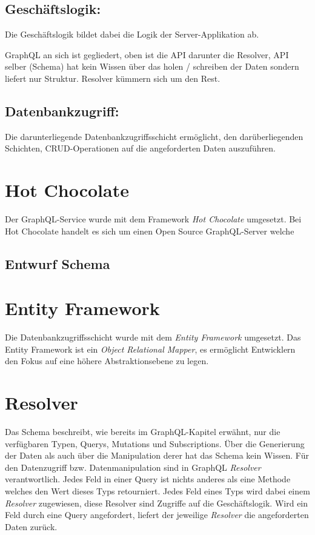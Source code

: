 
\subsection{Geschäftslogik:}
Die Geschäftslogik bildet dabei die Logik der Server-Applikation ab.

GraphQL an sich ist gegliedert, oben ist die API darunter die Resolver, API selber (Schema) hat kein Wissen über das holen / schreiben der Daten sondern liefert nur Struktur.
Resolver kümmern sich um den Rest.

\subsection{Datenbankzugriff:}
Die darunterliegende Datenbankzugriffsschicht ermöglicht, den darüberliegenden Schichten, CRUD-Operationen auf die angeforderten Daten auszuführen.


\section{Hot Chocolate}
Der GraphQL-Service wurde mit dem Framework \textit{Hot Chocolate} umgesetzt.
Bei Hot Chocolate handelt es sich um einen Open Source GraphQL-Server welche 

\subsection{Entwurf Schema}

\section{Entity Framework}
Die Datenbankzugriffsschicht wurde mit dem \textit{Entity Framework} umgesetzt.
Das Entity Framework ist ein \textit{Object Relational Mapper}, es ermöglicht Entwicklern den Fokus auf eine höhere Abstraktionsebene zu legen.

\section{Resolver}
Das Schema beschreibt, wie bereits im GraphQL-Kapitel erwähnt, nur die verfügbaren Typen, Querys, Mutations und Subscriptions.
Über die Generierung der Daten als auch über die Manipulation derer hat das Schema kein Wissen.
Für den Datenzugriff bzw. Datenmanipulation sind in GraphQL \textit{Resolver} verantwortlich.
Jedes Feld in einer Query ist nichts anderes als eine Methode welches den Wert dieses Typs retourniert.
Jedes Feld eines Typs wird dabei einem \textit{Resolver} zugewiesen, diese Resolver sind Zugriffe auf die Geschäftslogik.
Wird ein Feld durch eine Query angefordert, liefert der jeweilige \textit{Resolver} die angeforderten Daten zurück.

